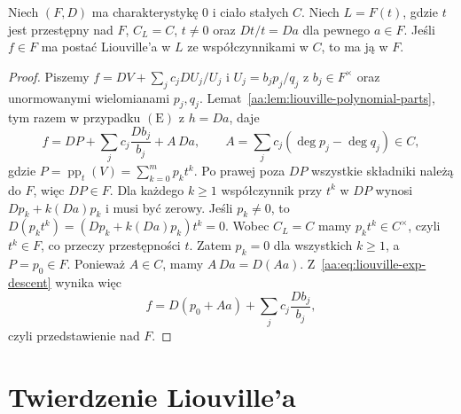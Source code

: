 \begin{lemat}
\label{aa:lem:liouville-exp-descent}
Niech $(F,D)$ ma charakterystykę $0$ i ciało
stałych $C$. Niech $L=F(t)$, gdzie $t$ jest
przestępny nad $F$, $C_L=C$, $t\ne0$ oraz
$Dt/t=Da$ dla pewnego $a\in F$.
Jeśli $f\in F$ ma postać Liouville'a w $L$
ze współczynnikami w $C$, to ma ją w $F$.
\end{lemat}
\begin{proof}
Piszemy $f=DV+\sum_jc_j DU_j/U_j$ i
$U_j=b_jp_j/q_j$ z $b_j\in F^\times$ oraz
unormowanymi wielomianami $p_j,q_j$.
Lemat~\ref{aa:lem:liouville-polynomial-parts},
tym razem w przypadku $(\mathrm E)$ z $h=Da$,
daje
\begin{equation}\label{aa:eq:liouville-exp-descent}
 f=DP+\sum_jc_j\frac{Db_j}{b_j}+A\,Da,
 \qquad
 A=\sum_jc_j(\deg p_j-\deg q_j)\in C,
\end{equation}
gdzie $P=\operatorname{pp}_t(V)=\sum_{k=0}^{m}p_kt^k$.
Po prawej poza $DP$ wszystkie składniki należą do $F$,
więc $DP\in F$. Dla każdego $k\ge1$
współczynnik przy $t^k$ w $DP$ wynosi
$Dp_k+k(Da)p_k$ i musi być zerowy.
Jeśli $p_k\ne0$, to
$D(p_kt^k)=(Dp_k+k(Da)p_k)t^k=0$.
Wobec $C_L=C$ mamy $p_kt^k\in C^\times$,
czyli $t^k\in F$, co przeczy przestępności $t$.
Zatem $p_k=0$ dla wszystkich $k\ge1$,
a $P=p_0\in F$. Ponieważ $A\in C$,
mamy $A\,Da=D(Aa)$. Z~\eqref{aa:eq:liouville-exp-descent}
wynika więc
\[
 f=D(p_0+Aa)+\sum_jc_j\frac{Db_j}{b_j},
\]
czyli przedstawienie nad $F$.
\end{proof}

\section{Twierdzenie Liouville'a}

